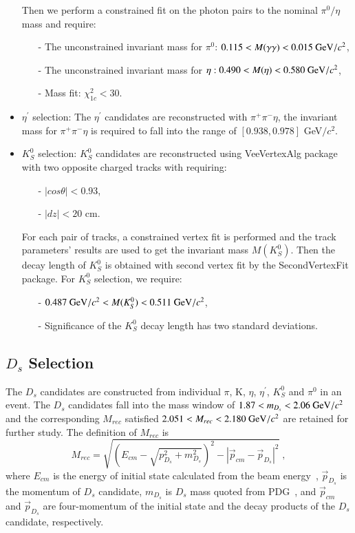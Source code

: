 \begin{itemize}
		Then we perform a constrained fit on the photon pairs to the nominal $\pi^{0}/\eta$ mass and require:
		\begin{itemize}
            \item[-] The unconstrained invariant mass for $\pi^{0}$: $0.115 < M(\gamma\gamma) < 0.015\ {\rm GeV}/c^{2}$,
            \item[-] The unconstrained invariant mass for $\eta: 0.490 < M(\eta) < 0.580\ {\rm GeV}/c^{2}$,
			\item[-] Mass fit: $\chi_{1c}^{2} < 30$.
		\end{itemize}
	\item $\eta^{'}$ selection: The $\eta^{'}$ candidates are reconstructed with $\pi^{+}\pi^{-}\eta$, the invariant mass for $\pi^{+}\pi^{-}\eta$ is required to fall into the range of $[0.938, 0.978]$ GeV$/c^{2}$.
	\item $K_{S}^{0}$ selection: $K_{S}^{0}$ candidates are reconstructed using VeeVertexAlg package with two opposite charged tracks with requiring:
		\begin{itemize}
			\item[-] $|cos\theta| < 0.93$,
			\item[-] $|dz| < 20$ cm.
		\end{itemize}

		For each pair of tracks, a constrained vertex fit is performed and the track parameters' results are used to get the invariant mass $M(K_{S}^{0})$. Then the decay length of $K_{S}^{0}$ is obtained with second vertex 
		fit by the SecondVertexFit package. For $K_{S}^{0}$ selection, we require:
		\begin{itemize}
            \item[-] ${\rm 0.487\ GeV}/c^{2} < M(K_S^{0}) < 0.511\ {\rm GeV}/c^{2}$,
			\item[-] Significance of the $K_{S}^{0}$ decay length has two standard deviations.
		\end{itemize}

\end{itemize}
\subsection{$D_{s}$ Selection}
The $D_{s}$ candidates are constructed from individual $\pi$, K, $\eta$, $\eta^{'}$, $K_{S}^{0}$ and $\pi^{0}$ in an event.
The $D_{s}$ candidates fall into the mass window of $1.87 < m_{D_{s}} < 2.06\ {\rm GeV}/c^{2}$ and 
the corresponding $M_{rec}$ satisfied $2.051 < M_{rec} < 2.180\ {\rm GeV}/c^{2}$ are retained for further study. The definition of $M_{rec}$ is
\begin{equation}
    M_{rec} = \sqrt{(E_{cm} - \sqrt{p_{D_{s}}^{2} + m_{D_{s}}^{2}})^{2} - |\vec p_{cm} - \vec p_{D_{s}} | ^{2}} \; , \label{con:inventoryflow}
\end{equation}
where $E_{cm}$ is the energy of initial state calculated from the beam energy~\cite{DocDB 580-v1}, $\vec p_{D_{s}}$ is the momentum of $D_{s}$ candidate, $m_{D_{s}}$ is $D_{s}$ mass quoted from PDG~\cite{PDG2018}, and $\vec p_{cm}$ and $\vec p_{D_{s}}$ are four-momentum of the initial state and the decay products of the $D_{s}$ candidate, respectively.

